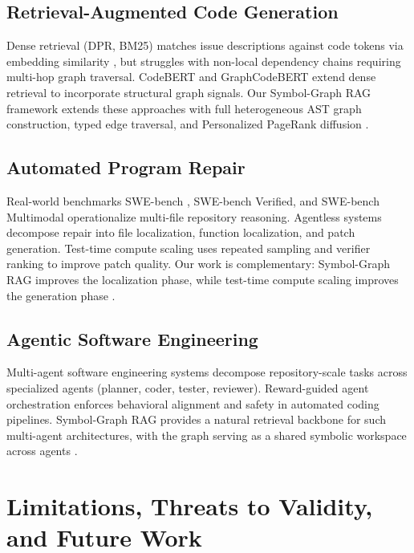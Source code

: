 \documentclass[10pt,twocolumn,letterpaper]{article}
\begin{document}
\subsection{Retrieval-Augmented Code Generation}


Dense retrieval (DPR, BM25) matches issue descriptions against code tokens via embedding similarity \cite{arxiv_2501_02842}, but struggles with non-local dependency chains requiring multi-hop graph traversal. CodeBERT \cite{arxiv_2002_08155} and GraphCodeBERT extend dense retrieval to incorporate structural graph signals. Our Symbol-Graph RAG framework extends these approaches with full heterogeneous AST graph construction, typed edge traversal, and Personalized PageRank diffusion \cite{crossref_10_1145_3689096_3689462}.


\subsection{Automated Program Repair}


Real-world benchmarks SWE-bench \cite{arxiv_2505_23419}, SWE-bench Verified, and SWE-bench Multimodal operationalize multi-file repository reasoning. Agentless systems \cite{arxiv_2501_02497} decompose repair into file localization, function localization, and patch generation. Test-time compute scaling \cite{arxiv_2203_11171} uses repeated sampling and verifier ranking to improve patch quality. Our work is complementary: Symbol-Graph RAG improves the localization phase, while test-time compute scaling improves the generation phase \cite{arxiv_2412_06333}.


\subsection{Agentic Software Engineering}


Multi-agent software engineering systems \cite{arxiv_2404_01131,arxiv_2412_06333} decompose repository-scale tasks across specialized agents (planner, coder, tester, reviewer). Reward-guided agent orchestration \cite{crossref_10_1109_access_2026_3656309} enforces behavioral alignment and safety in automated coding pipelines. Symbol-Graph RAG provides a natural retrieval backbone for such multi-agent architectures, with the graph serving as a shared symbolic workspace across agents \cite{crossref_10_18653_v1_2026_findings_acl_1933}.




\section{Limitations, Threats to Validity, and Future Work}
\end{document}
